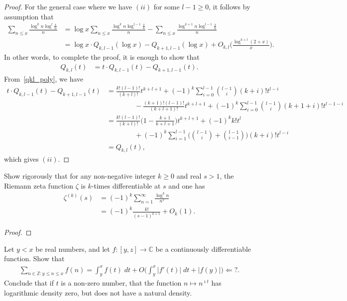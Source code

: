 \documentclass[11pt]{article}
\newenvironment{ex}[1]
  {\renewcommand\theinnercustomthm{#1}\innercustomthm}
  {\endinnercustomthm}
\begin{document}
\begin{proof}
For the general case where we have $(ii)$ for some $l-1\geq 0$, it follows by assumption that
\begin{align*}
\sum_{n\leq x}\frac{\log^k{n}\log^l{\frac{x}{n}}}{n} &= \log{x}\sum_{n\leq x}\frac{\log^k{n}\log^{l-1}{\frac{x}{n}}}{n} -\sum_{n\leq x}\frac{\log^{k+1}{n}\log^{l-1}{\frac{x}{n}}}{n}\\
&= \log{x}\cdot Q_{k,l-1}(\log{x})-Q_{k+1,l-1}(\log{x})+O_{k,l}\bigg(\frac{\log^{k+l}(2+x)}{x}\bigg).
\end{align*}
In other words, to complete the proof, it is enough to show that
\begin{align*}
Q_{k,l}(t) &= t\cdot Q_{k,l-1}(t)-Q_{k+1,l-1}(t).
\end{align*}
From~\eqref{qkl_poly}, we have
\begin{align*}
t\cdot Q_{k,l-1}(t)-Q_{k+1,l-1}(t) &= \frac{k!(l-1)!}{(k+l)!}t^{k+l+1}+(-1)^k\sum_{i=0}^{l-1}\binom{l-1}{i}(k+i)!t^{l-i}\\
& \qquad\qquad -\frac{(k+1)!(l-1)!}{(k+l+1)!}t^{k+l+1}+(-1)^k\sum_{i=0}^{l-1}\binom{l-1}{i}(k+1+i)!t^{l-1-i}\\
&= \frac{k!(l-1)!}{(k+l)!}\bigg(1-\frac{k+1}{k+l+1}\bigg)t^{k+l+1}+(-1)^kk!t^l\\
& \qquad\qquad +(-1)^k\sum_{i=1}^{l-1}\bigg(\binom{l-1}{i}+\binom{l-1}{i-1}\bigg)(k+i)!t^{l-i}\\
&= Q_{k,l}(t),
\end{align*}
which gives $(ii)$.
\end{proof}

\begin{ex}{10}\label{ten}
Show rigorously that for any non-negative integer $k\geq 0$ and real $s>1$, the Riemann zeta function $\zeta$ is $k$-times differentiable at $s$ and one has
\begin{align*}
\zeta^{(k)}(s) &= (-1)^k\sum_{n=1}^\infty\frac{\log^k{n}}{n^s}\\
&= (-1)^k\frac{k!}{(s-1)^{k+1}}+O_k(1).
\end{align*}
\end{ex}

\begin{proof}
\phantom{a}
\end{proof}

\begin{ex}{11}\label{eleven}
Let $y<x$ be real numbers, and let $f:[y,z]\to\mathbb{C}$ be a continuously differentiable function. Show that
\begin{align*}
\sum_{n\in\mathbb{Z}:y\leq n\leq x}f(n)=\int_y^xf(t)\;dt+O\bigg(\int_y^x|f'(t)|\;dt+|f(y)|\bigg)\Leftarrow ?.
\end{align*}
Conclude that if $t$ is a non-zero number, that the function $n\mapsto n^{\imath t}$ has logarithmic density zero, but does not have a natural density.
\end{ex}
\end{document}
